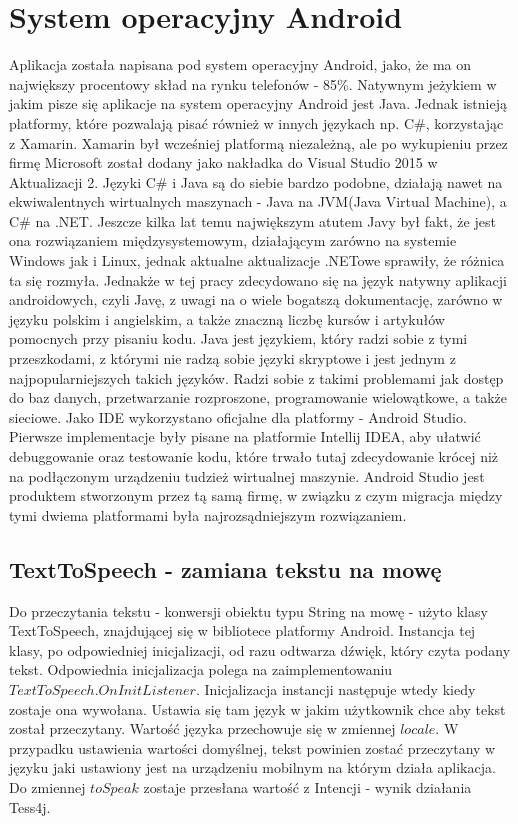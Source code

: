 \documentclass[eng,oneside]{mgr}
\begin{document}
\section{System operacyjny Android}
Aplikacja została napisana pod system operacyjny Android, jako, że ma on największy procentowy skład na rynku telefonów - 85\%\cite{procenty}. Natywnym jeżykiem w jakim pisze się aplikacje na system operacyjny Android jest Java. Jednak istnieją platformy, które pozwalają pisać również w innych językach np. C\#, korzystając z Xamarin. Xamarin był wcześniej platformą niezależną, ale po wykupieniu przez firmę Microsoft został dodany jako nakładka do Visual Studio 2015 w Aktualizacji 2. Języki C\# i Java są do siebie bardzo podobne, działają nawet na ekwiwalentnych wirtualnych maszynach - Java na JVM(Java Virtual Machine), a C\# na .NET. Jeszcze kilka lat temu największym atutem Javy był fakt, że jest ona rozwiązaniem międzysystemowym, działającym zarówno na systemie Windows jak i Linux\cite{thinking}, jednak aktualne aktualizacje .NETowe sprawiły, że różnica ta się rozmyła. Jednakże w tej pracy zdecydowano się na język natywny aplikacji androidowych, czyli Javę, z uwagi na o wiele bogatszą dokumentację, zarówno w języku polskim i angielskim, a także znaczną liczbę kursów i artykułów pomocnych przy pisaniu kodu. Java jest językiem, który radzi sobie z tymi przeszkodami, z którymi nie radzą sobie języki skryptowe i jest jednym z najpopularniejszych takich języków. Radzi sobie z takimi problemami jak dostęp do baz danych, przetwarzanie rozproszone, programowanie wielowątkowe, a także sieciowe\cite{java}. Jako IDE wykorzystano oficjalne dla platformy - Android Studio. Pierwsze implementacje były pisane na platformie Intellij IDEA, aby ułatwić debuggowanie oraz testowanie kodu, które trwało tutaj zdecydowanie krócej niż na podłączonym urządzeniu tudzież wirtualnej maszynie. Android Studio jest produktem stworzonym przez tą samą firmę, w związku z czym migracja między tymi dwiema platformami była najrozsądniejszym rozwiązaniem.
\subsection{TextToSpeech - zamiana tekstu na mowę}
Do przeczytania tekstu - konwersji obiektu typu String na mowę - użyto klasy TextToSpeech, znajdującej się w bibliotece platformy Android. Instancja tej klasy, po odpowiedniej inicjalizacji, od razu odtwarza dźwięk, który czyta podany tekst. Odpowiednia inicjalizacja polega na zaimplementowaniu $TextToSpeech.OnInitListener$\cite{texttospeech}. Inicjalizacja instancji następuje wtedy kiedy zostaje ona wywołana. Ustawia się tam język w jakim użytkownik chce aby tekst został przeczytany. Wartość języka przechowuje się w zmiennej $locale$. W przypadku ustawienia wartości domyślnej, tekst powinien zostać przeczytany w języku jaki ustawiony jest na urządzeniu mobilnym na którym działa aplikacja. Do zmiennej $toSpeak$ zostaje przesłana wartość z Intencji - wynik działania Tess4j.
\end{document}
